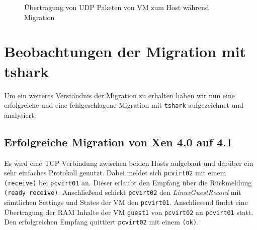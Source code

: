 \begin{figure}

\caption{Übertragung von UDP Paketen von VM zum Host während Migration}
\label{migration_plot}
\end{figure}

\section{Beobachtungen der Migration mit tshark} \label{mig_tcpdump}
Um ein weiteres Verständnis der Migration zu erhalten haben wir nun eine erfolgreiche und eine fehlgeschlagene Migration mit \verb#tshark# aufgezeichnet und analysiert:

\subsection{Erfolgreiche Migration von Xen 4.0 auf 4.1}
Es wird eine TCP Verbindung zwischen beiden Hosts aufgebaut und darüber ein sehr einfaches Protokoll genutzt. Dabei meldet sich \verb#pcvirt02# mit einem \verb|(receive)| bei \verb#pcvirt01# an. Dieser erlaubt den Empfang über die Rückmeldung \verb|(ready receive)|. Anschließend schickt \verb#pcvirt02# den \emph{LinuxGuestRecord} mit sämtlichen Settings und States der VM den \verb#pcvirt01#. Anschliesend findet eine Übertragung der RAM Inhalte der VM \verb#guest1# von \verb#pcvirt02#  an \verb#pcvirt01# statt. Den erfolgreichen Empfang quittiert \verb#pcvirt02# mit einem \verb|(ok)|.

